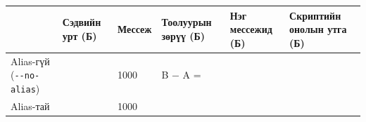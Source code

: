 \begingroup\scriptsize\begin{longtable}[]{@{}llllll@{}}
\toprule
\begin{minipage}[b]{0.14\columnwidth}\raggedright
\strut
\end{minipage} & \begin{minipage}[b]{0.14\columnwidth}\raggedright
Сэдвийн урт (Б)\strut
\end{minipage} & \begin{minipage}[b]{0.14\columnwidth}\raggedright
Мессеж\strut
\end{minipage} & \begin{minipage}[b]{0.14\columnwidth}\raggedright
Тоолуурын зөрүү (Б)\strut
\end{minipage} & \begin{minipage}[b]{0.14\columnwidth}\raggedright
Нэг мессежид (Б)\strut
\end{minipage} & \begin{minipage}[b]{0.14\columnwidth}\raggedright
Скриптийн онолын утга (Б)\strut
\end{minipage}\tabularnewline
\midrule
\endhead
\begin{minipage}[t]{0.14\columnwidth}\raggedright
Alias-гүй (\texttt{-\/-no-alias})\strut
\end{minipage} & \begin{minipage}[t]{0.14\columnwidth}\raggedright
\strut
\end{minipage} & \begin{minipage}[t]{0.14\columnwidth}\raggedright
1000\strut
\end{minipage} & \begin{minipage}[t]{0.14\columnwidth}\raggedright
B − A =\strut
\end{minipage} & \begin{minipage}[t]{0.14\columnwidth}\raggedright
\strut
\end{minipage} & \begin{minipage}[t]{0.14\columnwidth}\raggedright
\strut
\end{minipage}\tabularnewline
\begin{minipage}[t]{0.14\columnwidth}\raggedright
Alias-тай\strut
\end{minipage} & \begin{minipage}[t]{0.14\columnwidth}\raggedright
\strut
\end{minipage} & \begin{minipage}[t]{0.14\columnwidth}\raggedright
1000\strut
\end{minipage} & \begin{minipage}[t]{0.14\columnwidth}\raggedright

\end{minipage}
\end{longtable}
